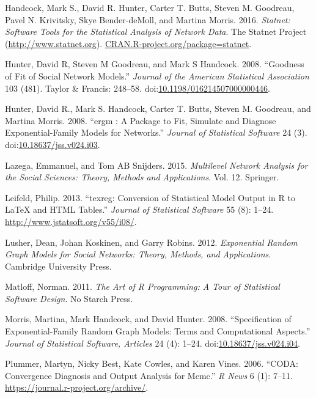 \documentclass[]{book}
\theoremstyle{definition}
\theoremstyle{definition}
\theoremstyle{definition}
\theoremstyle{remark}
\begin{document}
\hypertarget{ref-R-statnet}{}
Handcock, Mark S., David R. Hunter, Carter T. Butts, Steven M. Goodreau,
Pavel N. Krivitsky, Skye Bender-deMoll, and Martina Morris. 2016.
\emph{Statnet: Software Tools for the Statistical Analysis of Network
Data}. The Statnet Project (\url{http://www.statnet.org}).
\url{CRAN.R-project.org/package=statnet}.

\hypertarget{ref-HunterJASA2008}{}
Hunter, David R, Steven M Goodreau, and Mark S Handcock. 2008.
``Goodness of Fit of Social Network Models.'' \emph{Journal of the
American Statistical Association} 103 (481). Taylor \& Francis: 248--58.
doi:\href{https://doi.org/10.1198/016214507000000446}{10.1198/016214507000000446}.

\hypertarget{ref-Hunter2008}{}
Hunter, David R., Mark S. Handcock, Carter T. Butts, Steven M. Goodreau,
and Martina Morris. 2008. ``ergm : A Package to Fit, Simulate and
Diagnose Exponential-Family Models for Networks.'' \emph{Journal of
Statistical Software} 24 (3).
doi:\href{https://doi.org/10.18637/jss.v024.i03}{10.18637/jss.v024.i03}.

\hypertarget{ref-lazega2015}{}
Lazega, Emmanuel, and Tom AB Snijders. 2015. \emph{Multilevel Network
Analysis for the Social Sciences: Theory, Methods and Applications}.
Vol. 12. Springer.

\hypertarget{ref-R-texreg}{}
Leifeld, Philip. 2013. ``texreg: Conversion of Statistical Model Output
in R to LaTeX and HTML Tables.'' \emph{Journal of Statistical Software}
55 (8): 1--24. \url{http://www.jstatsoft.org/v55/i08/}.

\hypertarget{ref-lusher2012}{}
Lusher, Dean, Johan Koskinen, and Garry Robins. 2012. \emph{Exponential
Random Graph Models for Social Networks: Theory, Methods, and
Applications}. Cambridge University Press.

\hypertarget{ref-Matloff2011}{}
Matloff, Norman. 2011. \emph{The Art of R Programming: A Tour of
Statistical Software Design}. No Starch Press.

\hypertarget{ref-Morris2008}{}
Morris, Martina, Mark Handcock, and David Hunter. 2008. ``Specification
of Exponential-Family Random Graph Models: Terms and Computational
Aspects.'' \emph{Journal of Statistical Software, Articles} 24 (4):
1--24.
doi:\href{https://doi.org/10.18637/jss.v024.i04}{10.18637/jss.v024.i04}.

\hypertarget{ref-R-coda}{}
Plummer, Martyn, Nicky Best, Kate Cowles, and Karen Vines. 2006. ``CODA:
Convergence Diagnosis and Output Analysis for Mcmc.'' \emph{R News} 6
(1): 7--11. \url{https://journal.r-project.org/archive/}.
\end{document}

